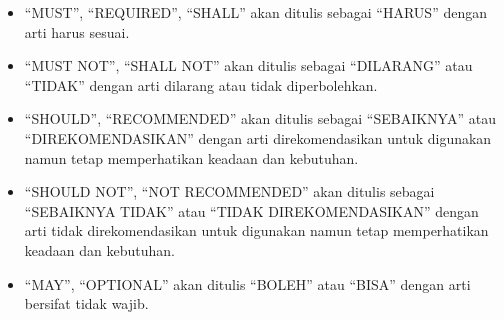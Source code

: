 \begin{itemize}
	\item ``MUST'', ``REQUIRED'', ``SHALL'' akan ditulis sebagai ``HARUS'' dengan arti harus sesuai.
	\item ``MUST NOT'', ``SHALL NOT'' akan ditulis sebagai ``DILARANG'' atau ``TIDAK'' dengan arti dilarang atau tidak diperbolehkan.
	\item ``SHOULD'', ``RECOMMENDED'' akan ditulis sebagai ``SEBAIKNYA'' atau ``DIREKOMENDASIKAN'' dengan arti direkomendasikan untuk digunakan namun tetap memperhatikan keadaan dan kebutuhan.
	\item ``SHOULD NOT'', ``NOT RECOMMENDED'' akan ditulis sebagai ``SEBAIKNYA TIDAK'' atau ``TIDAK DIREKOMENDASIKAN'' dengan arti tidak direkomendasikan untuk digunakan namun tetap memperhatikan keadaan dan kebutuhan.
	\item ``MAY'', ``OPTIONAL'' akan ditulis ``BOLEH'' atau ``BISA'' dengan arti bersifat tidak wajib.
\end{itemize}


